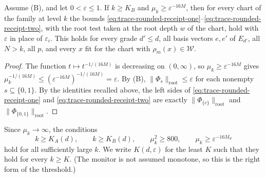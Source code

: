 \begin{lemma}\label{lem:trace-receipt-cost}
Assume (B), and let $0<\varepsilon\le1$. If $k\ge K_B$ and
$\mu_k\ge\varepsilon^{-16M}$, then for every chart of the family at level
$k$ the bounds
\eqref{eq:trace-rounded-receipt-one}--\eqref{eq:trace-rounded-receipt-two},
with the root test taken at the root depth $w$ of the chart, hold with
$\varepsilon$ in place of $\varepsilon_i$. This holds for every
grade $d'\le d$, all basis vectors $e,e'$ of $E_{d'}$, all $N>k$, all
$p$, and every $x$ fit for the chart with $\rho_m(x)\in\mathcal W$.
\end{lemma}
\begin{proof}
The function $t\mapsto t^{-1/(16M)}$ is decreasing on $(0,\infty)$, so
$\mu_k\ge\varepsilon^{-16M}$ gives
$\mu_k^{-1/(16M)}\le(\varepsilon^{-16M})^{-1/(16M)}=\varepsilon$. By
(B), $\|\Phi_s\|_{\mathrm{root}}\le\varepsilon$ for each nonempty
$s\subseteq\{0,1\}$. By the identities recalled above, the left sides
of \eqref{eq:trace-rounded-receipt-one} and
\eqref{eq:trace-rounded-receipt-two} are exactly
$\|\Phi_{\{c\}}\|_{\mathrm{root}}$ and
$\|\Phi_{\{0,1\}}\|_{\mathrm{root}}$.
\end{proof}

Since $\mu_k\to\infty$, the conditions
\[
 k\ge K_A(d),\qquad k\ge K_B(d),\qquad \mu_k^2\ge800,\qquad
 \mu_k\ge\varepsilon^{-16M_d}
\]
hold for all sufficiently large $k$. We write $K(d,\varepsilon)$ for the
least $K$ such that they hold for every $k\ge K$. (The monitor is not
assumed monotone, so this is the right form of the threshold.)

